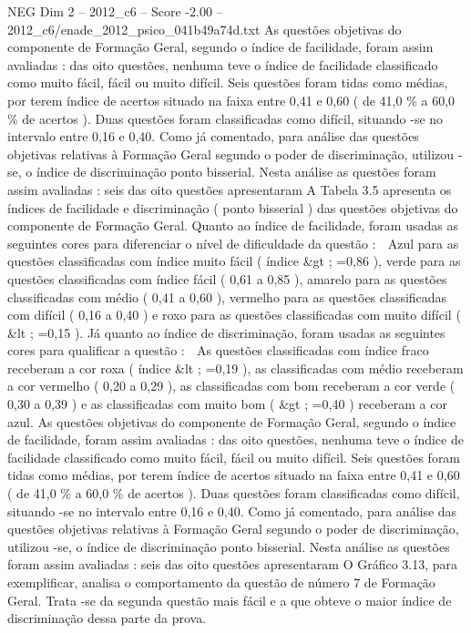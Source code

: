 \begin{textsample}{NEG Dim 2 – 2012\_c6 – Score -2.00 – 2012\_c6/enade\_2012\_psico\_041b49a74d.txt}
As questões objetivas do componente de Formação Geral, segundo o índice de facilidade, foram assim avaliadas : das oito questões, nenhuma teve o índice de facilidade classificado como muito fácil, fácil ou muito difícil.
Seis questões foram tidas como médias, por terem índice de acertos situado na faixa entre 0,41 e 0,60 ( de 41,0 \% a 60,0 \% de acertos ).
Duas questões foram classificadas como difícil, situando -se no intervalo entre 0,16 e 0,40.
Como já comentado, para análise das questões objetivas relativas à Formação Geral segundo o poder de discriminação, utilizou -se, o índice de discriminação ponto bisserial.
Nesta análise as questões foram assim avaliadas : seis das oito questões apresentaram A Tabela 3.5 apresenta os índices de facilidade e discriminação ( ponto bisserial ) das questões objetivas do componente de Formação Geral.
Quanto ao índice de facilidade, foram usadas as seguintes cores para diferenciar o nível de dificuldade da questão :  Azul para as questões classificadas com índice muito fácil ( índice \&gt ; =0,86 ), verde para as questões classificadas com índice fácil ( 0,61 a 0,85 ), amarelo para as questões classificadas com médio ( 0,41 a 0,60 ), vermelho para as questões classificadas com difícil ( 0,16 a 0,40 ) e roxo para as questões classificadas com muito difícil ( \&lt ; =0,15 ).
Já quanto ao índice de discriminação, foram usadas as seguintes cores para qualificar a questão :  As questões classificadas com índice fraco receberam a cor roxa ( índice \&lt ; =0,19 ), as classificadas com médio receberam a cor vermelho ( 0,20 a 0,29 ), as classificadas com bom receberam a cor verde ( 0,30 a 0,39 ) e as classificadas com muito bom ( \&gt ; =0,40 ) receberam a cor azul.
As questões objetivas do componente de Formação Geral, segundo o índice de facilidade, foram assim avaliadas : das oito questões, nenhuma teve o índice de facilidade classificado como muito fácil, fácil ou muito difícil.
Seis questões foram tidas como médias, por terem índice de acertos situado na faixa entre 0,41 e 0,60 ( de 41,0 \% a 60,0 \% de acertos ).
Duas questões foram classificadas como difícil, situando -se no intervalo entre 0,16 e 0,40.
Como já comentado, para análise das questões objetivas relativas à Formação Geral segundo o poder de discriminação, utilizou -se, o índice de discriminação ponto bisserial.
Nesta análise as questões foram assim avaliadas : seis das oito questões apresentaram O Gráfico 3.13, para exemplificar, analisa o comportamento da questão de número 7 de Formação Geral.
Trata -se da segunda questão mais fácil e a que obteve o maior índice de discriminação dessa parte da prova.

\end{textsample}
